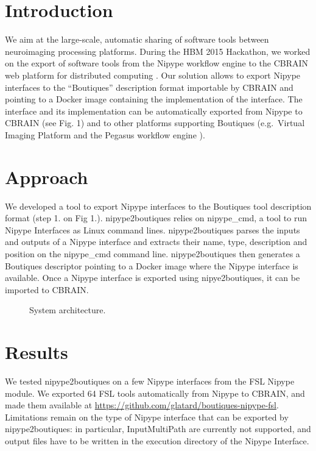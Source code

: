 \documentclass[twocolumn]{bmcart}%
\begin{document}

\section{Introduction}\label{introduction}

We aim at the large-scale, automatic sharing of software tools between
neuroimaging processing platforms. During the HBM 2015 Hackathon, we
worked on the export of software tools from the Nipype workflow engine
\cite{Gorgolewski2011} to the CBRAIN web platform for distributed
computing \cite{sherif2014cbrain}. Our solution allows to export Nipype
interfaces to the ``Boutiques'' description format importable by CBRAIN
and pointing to a Docker image containing the implementation of the
interface. The interface and its implementation can be automatically
exported from Nipype to CBRAIN (see Fig. 1) and to other platforms
supporting Boutiques (e.g.~Virtual Imaging Platform \cite{GLAT-13} and
the Pegasus workflow engine \cite{DEEL-16}).

\section{Approach}\label{approach}

We developed a tool to export Nipype interfaces to the Boutiques tool
description format (step 1. on Fig 1.). nipype2boutiques relies on
nipype\_cmd, a tool to run Nipype Interfaces as Linux command lines.
nipype2boutiques parses the inputs and outputs of a Nipype interface and
extracts their name, type, description and position on the nipype\_cmd
command line. nipype2boutiques then generates a Boutiques descriptor
pointing to a Docker image where the Nipype interface is available. Once
a Nipype interface is exported using nipye2boutiques, it can be imported
to CBRAIN.

\begin{figure}[h!]
  \def\svgwidth{\columnwidth}
  
  \caption{\label{centfig} System architecture.} 
\end{figure}

\section{Results}\label{results}

We tested nipype2boutiques on a few Nipype interfaces from the FSL
Nipype module. We exported 64 FSL tools automatically from Nipype to
CBRAIN, and made them available at
\url{https://github.com/glatard/boutiques-nipype-fsl}. Limitations
remain on the type of Nipype interface that can be exported by
nipype2boutiques: in particular, InputMultiPath are currently not
supported, and output files have to be written in the execution
directory of the Nipype Interface.
\end{document}
